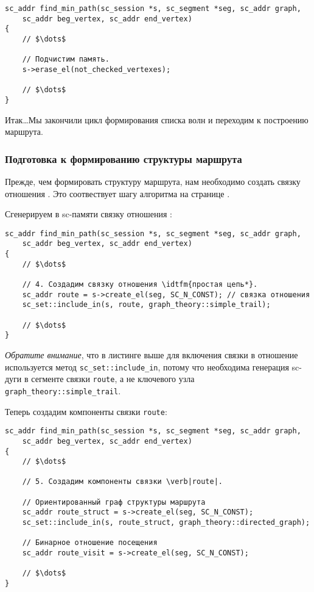 \begin{lstlisting}[texcl]
sc_addr find_min_path(sc_session *s, sc_segment *seg, sc_addr graph,
    sc_addr beg_vertex, sc_addr end_vertex)
{
    // $\dots$

    // Подчистим память.
    s->erase_el(not_checked_vertexes);

    // $\dots$
}
\end{lstlisting}

Итак\dots Мы закончили цикл формирования списка волн и переходим к
построению маршрута.

\subsubsection{Подготовка к формированию структуры маршрута}
\label{sec:libscprg_fmp_before_build_route}

Прежде, чем формировать структуру маршрута, нам необходимо создать
связку отношения . Это соотвествует шагу алгоритма
на странице \pageref{astep:S8_Create_route_tuple}.

Сгенерируем в sc-памяти связку отношения :
\begin{lstlisting}[texcl]
sc_addr find_min_path(sc_session *s, sc_segment *seg, sc_addr graph,
    sc_addr beg_vertex, sc_addr end_vertex)
{
    // $\dots$

    // 4. Создадим связку отношения \idtfm{простая цепь*}.
    sc_addr route = s->create_el(seg, SC_N_CONST); // связка отношения
    sc_set::include_in(s, route, graph_theory::simple_trail);

    // $\dots$
}
\end{lstlisting}

\emph{Обратите внимание}, что в листинге выше для включения связки в
отношение используется метод \lstinline|sc_set::include_in|, потому
что необходима генерация sc-дуги в сегменте связки \lstinline|route|,
а не ключевого узла \lstinline|graph_theory::simple_trail|.

Теперь создадим компоненты связки \lstinline|route|:

\begin{lstlisting}[texcl]
sc_addr find_min_path(sc_session *s, sc_segment *seg, sc_addr graph,
    sc_addr beg_vertex, sc_addr end_vertex)
{
    // $\dots$

    // 5. Создадим компоненты связки \verb|route|.
    
    // Ориентированный граф структуры маршрута
    sc_addr route_struct = s->create_el(seg, SC_N_CONST);
    sc_set::include_in(s, route_struct, graph_theory::directed_graph);
    
    // Бинарное отношение посещения
    sc_addr route_visit = s->create_el(seg, SC_N_CONST);

    // $\dots$
}
\end{lstlisting}

